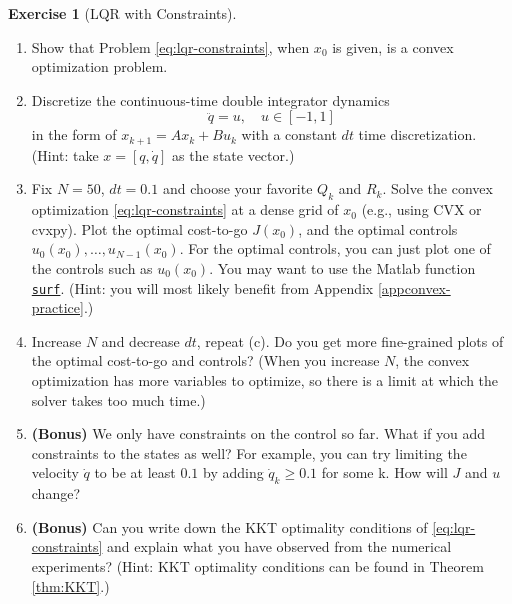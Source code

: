 \documentclass[
]{book}
\theoremstyle{definition}
\theoremstyle{definition}
\theoremstyle{definition}
\newtheorem{exercise}{Exercise}[chapter]
\theoremstyle{definition}
\theoremstyle{remark}
\begin{document}
\begin{exercise}[LQR with Constraints]
\begin{enumerate}
\def\labelenumi{\alph{enumi}.}
\item
  Show that Problem \eqref{eq:lqr-constraints}, when \(x_0\) is given, is a convex optimization problem.
\item
  Discretize the continuous-time double integrator dynamics
  \[
  \ddot{q} = u, \quad u \in [-1,1]
  \]
  in the form of \(x_{k+1} = A x_k + B u_k\) with a constant \(dt\) time discretization. (Hint: take \(x = [q,\dot{q}]\) as the state vector.)
\item
  Fix \(N=50\), \(dt=0.1\) and choose your favorite \(Q_k\) and \(R_k\). Solve the convex optimization \eqref{eq:lqr-constraints} at a dense grid of \(x_0\) (e.g., using CVX or cvxpy). Plot the optimal cost-to-go \(J(x_0)\), and the optimal controls \(u_0(x_0),\dots,u_{N-1}(x_0)\). For the optimal controls, you can just plot one of the controls such as \(u_0(x_0)\). You may want to use the Matlab function \href{https://www.mathworks.com/help/matlab/ref/surf.html}{\texttt{surf}}. (Hint: you will most likely benefit from Appendix \ref{appconvex-practice}.)
\item
  Increase \(N\) and decrease \(dt\), repeat (c). Do you get more fine-grained plots of the optimal cost-to-go and controls? (When you increase \(N\), the convex optimization has more variables to optimize, so there is a limit at which the solver takes too much time.)
\item
  \textbf{(Bonus)} We only have constraints on the control so far. What if you add constraints to the states as well? For example, you can try limiting the velocity \(\dot{q}\) to be at least \(0.1\) by adding \(\dot{q}_k \geq 0.1\) for some k. How will \(J\) and \(u\) change?
\item
  \textbf{(Bonus)} Can you write down the KKT optimality conditions of \eqref{eq:lqr-constraints} and explain what you have observed from the numerical experiments? (Hint: KKT optimality conditions can be found in Theorem \ref{thm:KKT}.)
\end{enumerate}

\end{exercise}

~
\end{document}
